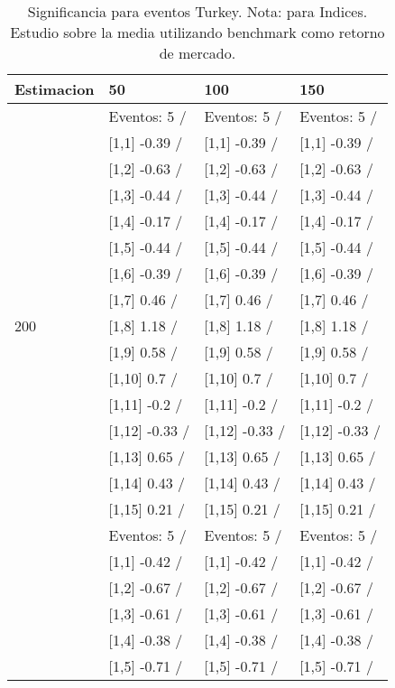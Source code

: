 \begin{table}

\caption{Significancia para eventos Turkey. Nota: para Indices. Estudio sobre la media utilizando benchmark como retorno de mercado.}
\centering
\begin{tabular}[t]{llll}
\toprule
Estimacion & 50 & 100 & 150\\
\midrule
 & Eventos:  5 / & Eventos:  5 / & Eventos:  5 /\\
 & {}[1,1] -0.39  / & {}[1,1] -0.39  / & {}[1,1] -0.39  /\\
 & {}[1,2] -0.63  / & {}[1,2] -0.63  / & {}[1,2] -0.63  /\\
 & {}[1,3] -0.44  / & {}[1,3] -0.44  / & {}[1,3] -0.44  /\\
 & {}[1,4] -0.17  / & {}[1,4] -0.17  / & {}[1,4] -0.17  /\\
\addlinespace
 & {}[1,5] -0.44  / & {}[1,5] -0.44  / & {}[1,5] -0.44  /\\
 & {}[1,6] -0.39  / & {}[1,6] -0.39  / & {}[1,6] -0.39  /\\
 & {}[1,7] 0.46  / & {}[1,7] 0.46  / & {}[1,7] 0.46  /\\
200 & {}[1,8] 1.18  / & {}[1,8] 1.18  / & {}[1,8] 1.18  /\\
 & {}[1,9] 0.58  / & {}[1,9] 0.58  / & {}[1,9] 0.58  /\\
\addlinespace
 & {}[1,10] 0.7  / & {}[1,10] 0.7  / & {}[1,10] 0.7  /\\
 & {}[1,11] -0.2  / & {}[1,11] -0.2  / & {}[1,11] -0.2  /\\
 & {}[1,12] -0.33  / & {}[1,12] -0.33  / & {}[1,12] -0.33  /\\
 & {}[1,13] 0.65  / & {}[1,13] 0.65  / & {}[1,13] 0.65  /\\
 & {}[1,14] 0.43  / & {}[1,14] 0.43  / & {}[1,14] 0.43  /\\
\addlinespace
 & {}[1,15] 0.21  / & {}[1,15] 0.21  / & {}[1,15] 0.21  /\\
 & Eventos:  5 / & Eventos:  5 / & Eventos:  5 /\\
 & {}[1,1] -0.42  / & {}[1,1] -0.42  / & {}[1,1] -0.42  /\\
 & {}[1,2] -0.67  / & {}[1,2] -0.67  / & {}[1,2] -0.67  /\\
 & {}[1,3] -0.61  / & {}[1,3] -0.61  / & {}[1,3] -0.61  /\\
\addlinespace
 & {}[1,4] -0.38  / & {}[1,4] -0.38  / & {}[1,4] -0.38  /\\
 & {}[1,5] -0.71  / & {}[1,5] -0.71  / & {}[1,5] -0.71  /\\

\end{tabular}
\end{table}
